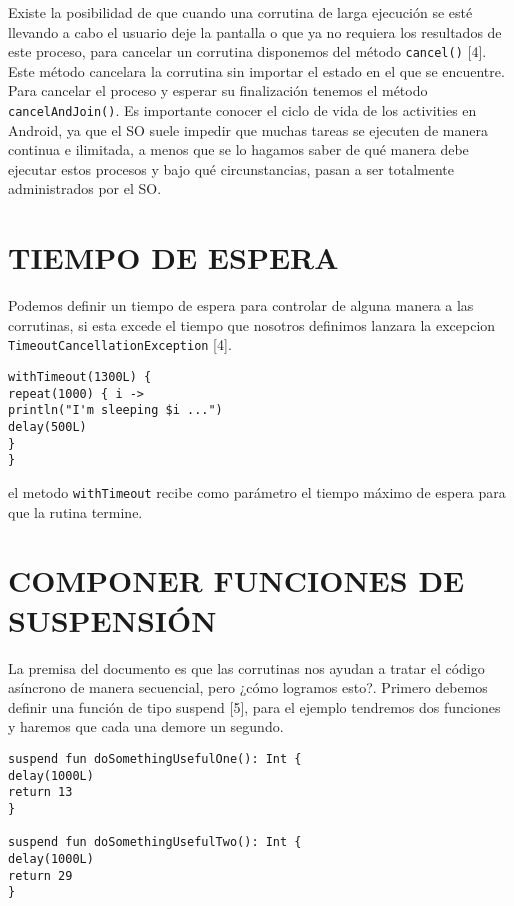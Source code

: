 \documentclass[twocolumn,10pt,abstract=on]{asme2ej}
\begin{document}
Existe la posibilidad de que cuando una corrutina de larga ejecución se esté llevando a cabo el usuario deje la pantalla o que ya no requiera los resultados de este proceso, para cancelar un corrutina disponemos del método \verb+cancel()+ [4]. Este método cancelara la corrutina sin importar el estado en el que se encuentre. Para cancelar el proceso y esperar su finalización tenemos el método \verb+cancelAndJoin()+.\linebreak\linebreak
Es importante conocer el ciclo de vida de los activities en Android, ya que el SO suele impedir que muchas tareas se ejecuten de manera continua e ilimitada, a menos que se lo hagamos saber de qué manera debe ejecutar estos procesos y bajo qué circunstancias, pasan a ser totalmente administrados por el SO.

\section{TIEMPO DE ESPERA}

Podemos definir un tiempo de espera para controlar de alguna manera a las corrutinas, si esta excede el tiempo que nosotros definimos lanzara la excepcion \verb+TimeoutCancellationException+ [4].

\begin{verbatim}
withTimeout(1300L) {
repeat(1000) { i ->
println("I'm sleeping $i ...")
delay(500L)
}
}
\end{verbatim}

el metodo \verb+withTimeout+ recibe como parámetro el tiempo máximo de espera para que la rutina termine.


\section{COMPONER FUNCIONES DE SUSPENSIÓN}

La premisa del documento es que las corrutinas nos ayudan a tratar el código asíncrono de manera secuencial, pero ¿cómo logramos esto?. \linebreak \linebreak
Primero debemos definir una función de tipo suspend [5], para el ejemplo tendremos dos funciones y haremos que cada una demore un segundo.

\begin{verbatim}
suspend fun doSomethingUsefulOne(): Int {
delay(1000L) 
return 13
}

suspend fun doSomethingUsefulTwo(): Int {
delay(1000L)
return 29
}
\end{verbatim}
\end{document}
